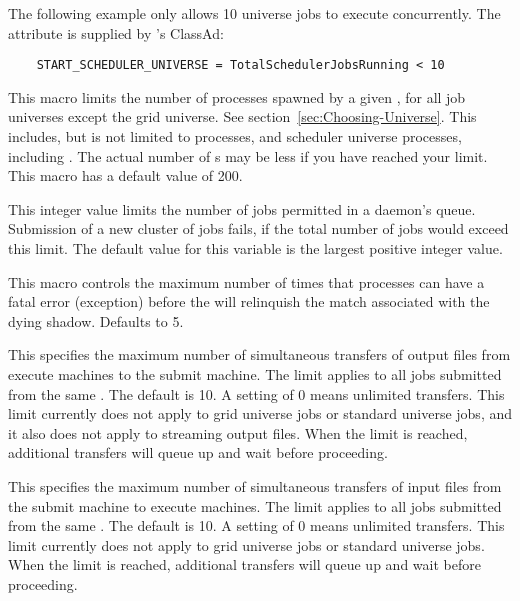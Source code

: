 \begin{description}
  The following example only allows 10  universe jobs to
  execute concurrently. The attribute 
  is supplied by 's ClassAd:
  
  \footnotesize
  \begin{verbatim}
    START_SCHEDULER_UNIVERSE = TotalSchedulerJobsRunning < 10
  \end{verbatim}
  \normalsize
  
  
\item[\Macro{MAX\_JOBS\_RUNNING}] \label{param:MaxJobsRunning} This
  macro limits the number of processes spawned by a given
  , for all job universes except the 
  grid universe.  See section~\ref{sec:Choosing-Universe}.
  This includes, but is not limited to  processes,
  and scheduler universe processes, including .
  The actual
  number of s may be less if you have reached
  your  limit.
  This macro has a default value of 200.

\item[\Macro{MAX\_JOBS\_SUBMITTED}] \label{param:MaxJobsSubmitted}
  This integer value limits the number of jobs permitted in 
  a  daemon's queue. Submission of a new cluster
  of jobs fails, if the total number of jobs would exceed this limit. 
  The default value for this variable is the largest positive
  integer value.

\item[\Macro{MAX\_SHADOW\_EXCEPTIONS}]
  \label{param:MaxShadowExceptions} This macro controls the maximum
  number of times that  processes can have a fatal
  error (exception) before the  will relinquish
  the match associated with the dying shadow.  Defaults to 5.

\item[\Macro{MAX\_CONCURRENT\_DOWNLOADS}]
  \label{param:MaxConcurrentDownloads} This specifies the maximum
  number of simultaneous transfers of output files from execute
  machines to the submit machine.  The limit applies to all jobs
  submitted from the same .  The default is 10.  A
  setting of 0 means unlimited transfers.  This limit currently does
  not apply to grid universe jobs or standard universe jobs, and it
  also does not apply to streaming output files.  When the limit is
  reached, additional transfers will queue up and wait before
  proceeding.

\item[\Macro{MAX\_CONCURRENT\_UPLOADS}]
  \label{param:MaxConcurrentUploads} This specifies the maximum
  number of simultaneous transfers of input files from the submit
  machine to execute machines.  The limit applies to all jobs
  submitted from the same .  The default is 10.  A
  setting of 0 means unlimited transfers.  This limit currently does
  not apply to grid universe jobs or standard universe jobs.  When the
  limit is reached, additional transfers will queue up and wait before
  proceeding.


\end{description}
